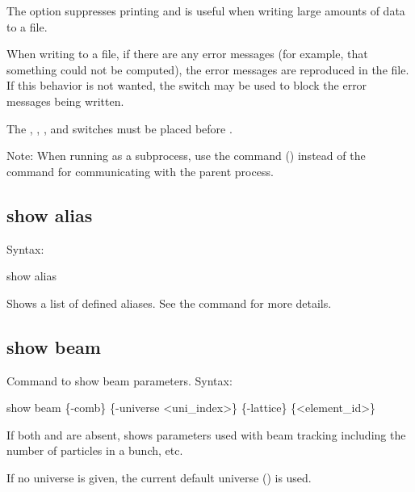 {{{{{{{{The  option suppresses printing and is useful when writing large amounts of data to a
file.

When writing to a file, if there are any error messages (for example, that something could not be
computed), the error messages are reproduced in the file. If this behavior is not wanted, the
 switch may be used to block the error messages being written.

The , , , and  switches must be placed before
.

Note: When running \tao as a subprocess, use the  command ()
instead of the  command for communicating with the parent process.



\subsection{show alias}
\label{s:show.alias}

Syntax:
\begin{example}
  show alias
\end{example}

Shows a list of defined aliases. See the  command for more details.


\subsection{show beam}
\label{s:show.beam}

Command to show beam parameters. Syntax:
\begin{example}
  show beam \{-comb\} \{-universe <uni_index>\} \{-lattice\} \{<element_id>\}
\end{example}

If both  and  are absent,  shows parameters
used with beam tracking including the number of particles in a bunch, etc.

If no universe is given, the current default universe () is used.

}}}}}}}}
